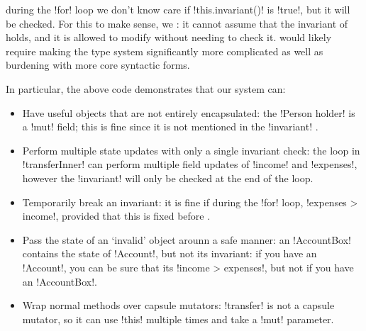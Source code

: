 during the \Q!for! loop\IO{)} we don't know  care if \Q!this.invariant()! is \Q!true!, but   it will be checked. For this to make sense, we  : it cannot assume that the invariant of   holds, and it is allowed to modify   without needing to check it.  would likely require making the type system significantly more complicated as well as burdening   with more core syntactic forms. 

 In particular, the above code demonstrates that our system can:
\begin{itemize}
\item Have useful objects that are not entirely encapsulated: the \Q!Person holder! is a \Q!mut! field; this is fine since it is not mentioned in the  \Q!invariant! .
\item Perform multiple state updates with only a single invariant check: the loop in \Q!transferInner!  can perform multiple field updates of \Q!income! and \Q!expenses!, however the \Q!invariant! will only be checked at the end of the loop.
\item Temporarily break an invariant: it is fine if during the \Q!for! loop, \Q!expenses > income!, provided that this is fixed before  .
\item Pass the state of an `invalid' object arounn a safe manner: an \Q!AccountBox! contains the state of \Q!Account!, but not its invariant: if you have an \Q!Account!, you can be sure that its \Q!income > expenses!, but not if you have an \Q!AccountBox!.
\item Wrap normal methods over capsule mutators:  \Q!transfer! is not a capsule mutator, so it can use \Q!this! multiple times and take a \Q!mut! parameter.
\end{itemize}

